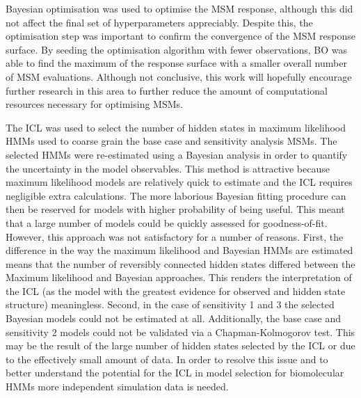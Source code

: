 Bayesian optimisation was used to optimise the MSM response, although this did not affect the final set of hyperparameters appreciably. Despite this, the optimisation step was important to confirm the convergence of the MSM response surface. By seeding the optimisation algorithm with fewer observations, BO was able to find the maximum of the response surface with a smaller overall number of MSM evaluations. Although not conclusive, this work will hopefully encourage further research in this area to further reduce the amount of computational resources necessary for optimising MSMs. 

The ICL was used to select the number of hidden states in maximum likelihood HMMs used to coarse grain the base case and sensitivity analysis MSMs. The selected HMMs were re-estimated using a Bayesian analysis in order to quantify the uncertainty in the model observables. This method is attractive because maximum likelihood models are relatively quick to estimate and the ICL requires negligible extra calculations. The more laborious Bayesian fitting procedure can then be reserved for models with higher probability of being useful. This meant that a large number of models could be quickly assessed for goodness-of-fit. However, this approach was not satisfactory for a number of reasons. First, the difference in the way the maximum likelihood and Bayesian HMMs are estimated means that the number of reversibly connected hidden states differed between the Maximum likelihood and Bayesian approaches. This renders the interpretation of the ICL (as the model with the greatest evidence for observed and hidden state structure) meaningless. Second, in the case of sensitivity 1 and 3 the selected Bayesian models could not be estimated at all. Additionally, the base case and sensitivity 2 models could not be validated via a Chapman-Kolmogorov test. This may be the result of the large number of hidden states selected by the ICL or due to the effectively small amount of data. In order to resolve this issue and to better understand the potential for the ICL in model selection for biomolecular HMMs more independent simulation data is needed. 

